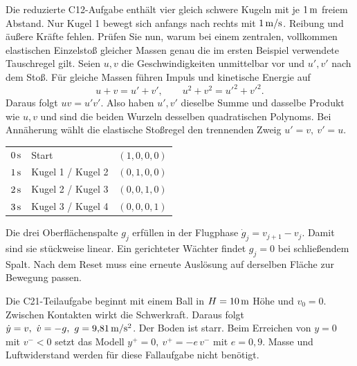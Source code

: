 Die reduzierte C12-Aufgabe enthält vier gleich schwere Kugeln mit je \(1\,\mathrm{m}\) freiem Abstand. Nur Kugel 1 bewegt sich anfangs nach rechts mit \(1\,\mathrm{m/s}\). Reibung und äußere Kräfte fehlen. Prüfen Sie nun, warum bei einem zentralen, vollkommen elastischen Einzelstoß gleicher Massen genau die im ersten Beispiel verwendete Tauschregel gilt.
Seien \(u,v\) die Geschwindigkeiten unmittelbar vor und \(u',v'\) nach dem Stoß. Für gleiche Massen führen Impuls und kinetische Energie auf
\[
 u+v=u'+v',\qquad u^2+v^2=u'^2+v'^2 .
\]
Daraus folgt \(uv=u'v'\). Also haben \(u',v'\) dieselbe Summe und dasselbe Produkt wie \(u,v\) und sind die beiden Wurzeln desselben quadratischen Polynoms. Bei Annäherung wählt die elastische Stoßregel den trennenden Zweig \(u'=v,\ v'=u\).
{\tblstart\begin{tabularx}{\linewidth}{@{}lYY@{}}\toprule
{}&&\\\midrule
\(0\,\mathrm{s}\)&Start&\((1,0,0,0)\)\\
\(1\,\mathrm{s}\)&Kugel 1 / Kugel 2&\((0,1,0,0)\)\\
\(2\,\mathrm{s}\)&Kugel 2 / Kugel 3&\((0,0,1,0)\)\\
\(3\,\mathrm{s}\)&Kugel 3 / Kugel 4&\((0,0,0,1)\)\\\bottomrule
\end{tabularx}\par}
Die drei Oberflächenspalte \(g_j\) erfüllen in der Flugphase \(\dot g_j=v_{j+1}-v_j\). Damit sind sie stückweise linear. Ein gerichteter Wächter findet \(g_j=0\) bei schließendem Spalt. Nach dem Reset muss eine erneute Auslösung auf derselben Fläche zur Bewegung passen.

Die C21-Teilaufgabe beginnt mit einem Ball in \(H=10\,\mathrm{m}\) Höhe und \(v_0=0\). Zwischen Kontakten wirkt die Schwerkraft. Daraus folgt \(\dot y=v,\ \dot v=-g,\ g=9{,}81\unitm{m/s^2}\). Der Boden ist starr. Beim Erreichen von \(y=0\) mit \(v^-<0\) setzt das Modell \(y^+=0,\ v^+=-e\,v^-\) mit \(e=0{,}9\). Masse und Luftwiderstand werden für diese Fallaufgabe nicht benötigt.

